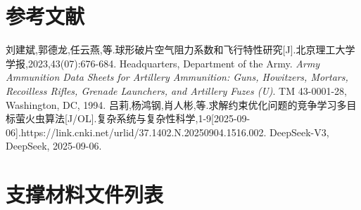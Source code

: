 \documentclass[fontset=SimSun]{ctexart}
\begin{document}
\section{参考文献}
\label{sec:references}

\begin{thebibliography}{99}
 刘建斌,郭德龙,任云燕,等.球形破片空气阻力系数和飞行特性研究[J].北京理工大学学报,2023,43(07):676-684.
 Headquarters, Department of the Army. \textit{Army Ammunition Data Sheets for Artillery Ammunition: Guns, Howitzers, Mortars, Recoilless Rifles, Grenade Launchers, and Artillery Fuzes (U)}. TM 43-0001-28, Washington, DC, 1994.
 吕莉,杨鸿钢,肖人彬,等.求解约束优化问题的竞争学习多目标萤火虫算法[J/OL].复杂系统与复杂性科学,1-9[2025-09-06].https://link.cnki.net/urlid/37.1402.N.20250904.1516.002.
 DeepSeek-V3, DeepSeek, 2025-09-06.
\end{thebibliography}
\newpage
\section{支撑材料文件列表}
\label{sec:support_materials}
\end{document}
